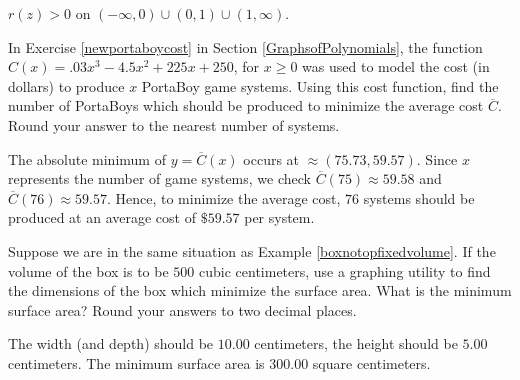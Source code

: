 \documentclass{ximera}
\begin{document}
\begin{question}
\begin{problem}

\begin{solution}
$r(z) > 0$ on $(-\infty, 0) \cup (0,1) \cup (1, \infty)$.
\end{solution}
\end{problem} 

\end{question}


\begin{problem}
In Exercise \ref{newportaboycost} in Section \ref{GraphsofPolynomials},  the function $C(x) = .03x^{3} - 4.5x^{2} + 225x + 250$, for $x \geq 0$ was used to model the cost (in dollars) to produce $x$ PortaBoy game systems. Using this cost function, find the number of PortaBoys which should be produced to minimize the average cost $\overline{C}$.  Round your answer to the nearest number of systems.     

\begin{solution}
    The absolute minimum of $y=\overline{C}(x)$ occurs at $\approx (75.73, 59.57)$.  Since $x$ represents the number of game systems, we check $\overline{C}(75) \approx 59.58$ and $\overline{C}(76) \approx 59.57$.  Hence, to minimize the average cost, $76$ systems should be produced at an average cost of $\$59.57$ per system.
\end{solution}
\end{problem}  

\begin{problem}
Suppose we are in the same situation as Example \ref{boxnotopfixedvolume}.  If the volume of the box is to be $500$ cubic centimeters, use a graphing utility to find the dimensions of the box which minimize the surface area.  What is the minimum surface area?  Round your answers to two decimal places.

\begin{solution}
    The width (and depth) should be $10.00$ centimeters, the height should be $5.00$ centimeters.  The minimum surface area is $300.00$ square centimeters.
\end{solution}
\end{problem} 
\end{document}
